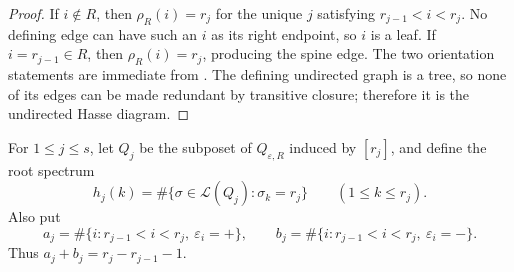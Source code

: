 \documentclass[10pt,a4paper]{amsart}
\newcommand{\eps}{\varepsilon}
\begin{document}
\begin{proof}
If \(i\notin R\), then \(\rho_R(i)=r_j\) for the unique \(j\) satisfying
\(r_{j-1}<i<r_j\).  No defining edge can have such an \(i\) as its right
endpoint, so \(i\) is a leaf.  If \(i=r_{j-1}\in R\), then
\(\rho_R(i)=r_j\), producing the spine edge.  The two orientation statements
are immediate from .  The defining undirected graph is a
tree, so none of its edges can be made redundant by transitive closure;
therefore it is the undirected Hasse diagram.
\end{proof}

For \(1\le j\le s\), let \(Q_j\) be the subposet of \(Q_{\eps,R}\) induced by
\([r_j]\), and define the root spectrum
\[
h_j(k)=\#\{\sigma\in\mathcal L(Q_j):\sigma_k=r_j\}
\qquad(1\le k\le r_j).
\]
Also put
\[
a_j=\#\{i:r_{j-1}<i<r_j,\ \eps_i=+\},\qquad
b_j=\#\{i:r_{j-1}<i<r_j,\ \eps_i=-\}.
\]
Thus \(a_j+b_j=r_j-r_{j-1}-1\).
\end{document}
